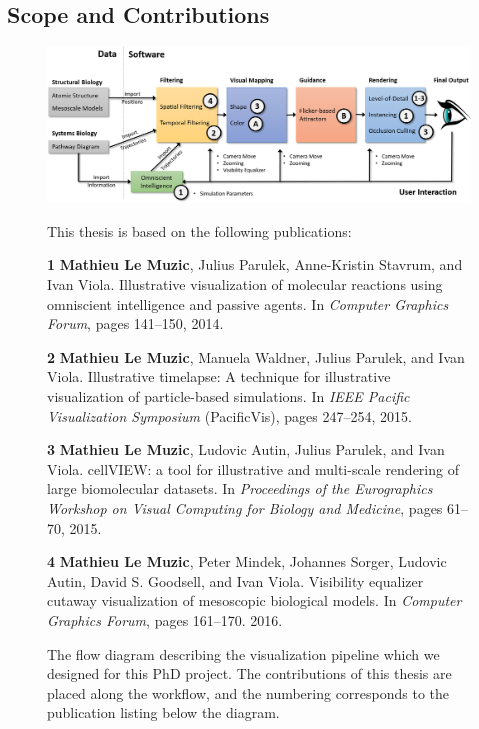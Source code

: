 \subsection{Scope and Contributions}

\begin{figure}
	\centering	
	\caption{The flow diagram describing the visualization pipeline which we designed for this PhD project. 
		The contributions of this thesis are placed along the workflow, and the numbering corresponds to the publication listing below the diagram.}
	
	\subfloat
	{
		\centering
		\includegraphics[width=1\linewidth]{"resources/master diagram3"}
	}	
	\subfloat
	{		
		This thesis is based on the following publications:		
		\begin{list}{}{}			
			\label{fig:list-contributions}
			\item[\textbf{1}]\textbf{Mathieu Le Muzic}, Julius Parulek, Anne-Kristin Stavrum, and Ivan Viola. Illustrative visualization of molecular reactions using omniscient intelligence and passive agents. In \textit{Computer Graphics Forum}, pages 141–150, 2014. 
			
			\item[\textbf{2}]\textbf{Mathieu Le Muzic}, Manuela Waldner, Julius Parulek, and Ivan Viola. Illustrative timelapse: A technique for illustrative visualization of particle-based simulations. In \textit{IEEE Pacific Visualization Symposium} (PacificVis), pages 247–254, 2015.
			
			\item[\textbf{3}]\textbf{Mathieu Le Muzic}, Ludovic Autin, Julius Parulek, and Ivan Viola. cellVIEW: a tool for illustrative and multi-scale rendering of large biomolecular datasets. In \textit{Proceedings of the Eurographics Workshop on Visual Computing for Biology and Medicine}, pages 61–70, 2015.
			
			\item[\textbf{4}]\textbf{Mathieu Le Muzic}, Peter Mindek, Johannes Sorger, Ludovic Autin, David S. Goodsell, and Ivan Viola. Visibility equalizer cutaway visualization of mesoscopic biological models. In \textit{Computer Graphics Forum}, pages 161–170. 2016.				
		\end{list}			
		
}
\end{figure}
